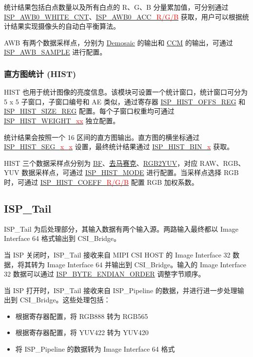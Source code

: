 \documentclass[main\_\_CN.tex]{subfiles}
\begin{document}
统计结果包括白点数量以及所有白点的 R、G、B 分量累加值，可分别通过 \hyperref[fielddesc:ISPAWB0WHITECNT]{ISP\_AWB0\_WHITE\_CNT}、\hyperref[fielddesc:ISPAWB0ACCR]{ISP\_AWB0\_ACC\_\textcolor{red}{R/G/B}} 获取，用户可以根据统计结果实现摄像头的自动白平衡算法。

AWB 有两个数据采样点，分别为 \hyperref[sec:isp_demosaic]{Demosaic} 的输出和 \hyperref[sec:isp_ccm]{CCM} 的输出，可通过 \hyperref[fielddesc:ISPAWBSAMPLE]{ISP\_AWB\_SAMPLE} 进行配置。


\subsubsection{直方图统计 (HIST)}
HIST 也用于统计图像的亮度信息。该模块可设置一个统计窗口，统计窗口可分为 5 x 5 子窗口，子窗口编号和 AE 类似，通过寄存器 \hyperref[regdesc:ISPHISTOFFSREG]{ISP\_HIST\_OFFS\_REG} 和 \hyperref[regdesc:ISPHISTSIZEREG]{ISP\_HIST\_SIZE\_REG} 配置。每个子窗口权重均可通过 \hyperref[fielddesc:ISPHISTWEIGHT00]{ISP\_HIST\_WEIGHT\_\textcolor{red}{xx}} 独立配置。

统计结果会按照一个 16 区间的直方图输出。直方图的横坐标通过 \hyperref[fielddesc:ISPHISTSEG01]{ISP\_HIST\_SEG\_\textcolor{red}{x\_x}} 设置，最终统计结果通过 \hyperref[fielddesc:ISPHISTBIN0]{ISP\_HIST\_BIN\_\textcolor{red}{x}} 获取。

HIST 三个数据采样点分别为 \hyperref[sec:isp_bf]{BF}、\hyperref[sec:isp_demosaic]{去马赛克}、\hyperref[sec:isp_rgb2yuv]{RGB2YUV}，对应 RAW、RGB、YUV 数据采样点，可通过 \hyperref[fielddesc:ISPHISTMODE]{ISP\_HIST\_MODE} 进行配置。当采样点选择 RGB 时，可通过 \hyperref[fielddesc:ISPHISTCOEFFR]{ISP\_HIST\_COEFF\_\textcolor{red}{R/G/B}} 配置 RGB 加权系数。

\subsection{ISP\_Tail}
ISP\_Tail 为后处理部分，其输入数据有两个输入源。两路输入最终都以 Image Interface 64 格式输出到 CSI\_Bridge。

当 ISP 关闭时，ISP\_Tail 接收来自 MIPI CSI HOST 的 Image Interface 32 数据，将其转为 Image Interface 64 并输出到 CSI\_Bridge。输入的 Image Interface 32 数据可以通过
\hyperref[fielddesc:ISPBYTEENDIANORDER]{ISP\_BYTE\_ENDIAN\_ORDER} 调整字节顺序。

当 ISP 打开时，ISP\_Tail 接收来自 ISP\_Pipeline 的数据，并进行进一步处理输出到 CSI\_Bridge。这些处理包括：
\begin{itemize}
    \item 根据寄存器配置，将 RGB888 转为 RGB565
    \item 根据寄存器配置，将 YUV422 转为 YUV420
    \item 将 ISP\_Pipeline 的数据转为 Image Interface 64 格式
\end{itemize}
\end{document}
